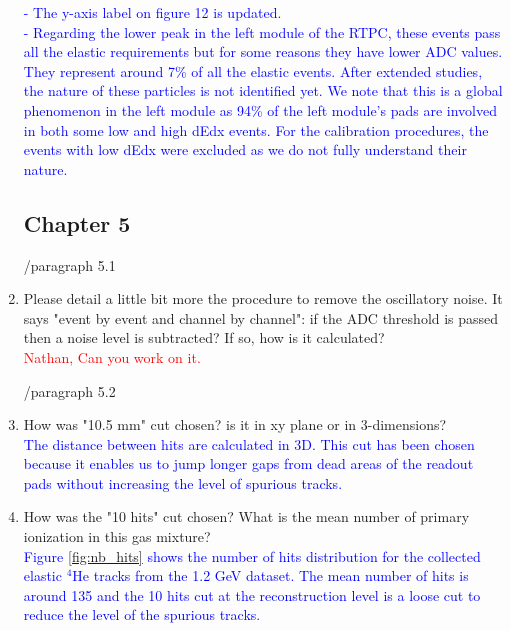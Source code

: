\documentclass[a4paper,11pt,twoside]{article}
\begin{document}
\begin{enumerate}
\textcolor{blue}{- The y-axis label on figure 12 is updated.\\}
\textcolor{blue}{- Regarding the lower peak in the left module of the RTPC, 
   these events pass all the elastic requirements but for some reasons they 
   have lower ADC values.  They represent around 7\% of all the elastic events.  
   After extended studies, the nature of these particles is not identified yet.  
   We note that this is a global phenomenon in the left module as 94\% of the 
   left module's pads are involved in both some low and high dEdx events. For 
   the calibration procedures, the events with low dEdx were excluded as we do 
not fully understand their nature.} 

\subsection*{ Chapter 5}
        /paragraph 5.1	
     
\item Please detail a little bit more the procedure to remove the oscillatory 
   noise. It says "event by event and channel by channel": if the ADC threshold 
   is passed then a noise level is subtracted? If so, how is it calculated?\\
\textcolor{red}{Nathan, Can you work on it. } 

/paragraph 5.2
\item How was "10.5 mm" cut chosen? is it in xy plane or in 3-dimensions?\\
\textcolor{blue}{The distance between hits are calculated in 3D. This cut has 
been chosen because it enables us to jump longer gaps from dead areas of the 
readout pads without increasing the level of spurious tracks.} 

\item How was the "10 hits" cut chosen? What is the mean number of primary 
   ionization in this gas mixture?\\
   \textcolor{blue}{Figure \ref{fig:nb_hits} shows the number of hits 
   distribution for the collected elastic $^4$He tracks from the 1.2 GeV 
dataset. The mean number of hits is around 135 and the 10 hits cut at the 
reconstruction level is a loose cut to reduce the level of the spurious 
tracks.}


\end{enumerate}
\end{document}
